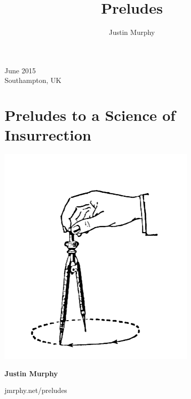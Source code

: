 \documentclass[12pt, twocolumn, oneside]{article}  	%
\title{Preludes}
\author{Justin Murphy}
\date{}							%
\begin{document}

\setlength{\parindent}{0pt}




\newpage

\thispagestyle{empty}


\vspace*{30em}


June 2015 \\
Southampton, UK

\newpage

\vspace*{1em}

\section*{ Preludes to a Science of Insurrection}

\begin{center}

\includegraphics{compass.png}

\vspace*{3em}

\begin{large}
\textbf{Justin Murphy}
\end{large}

\begin{normalsize}
jmrphy.net/preludes \\
\end{normalsize}

\end{center}
\end{document}
